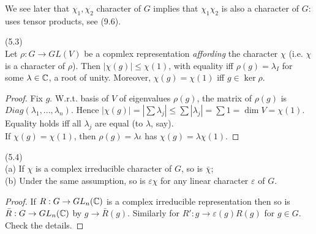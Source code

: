 \documentclass[a4paper]{article}
\begin{document}
\begin{rem}
We see later that $\chi_1,\chi_2$ character of $G$ implies that $\chi_1\chi_2$ is also a character of $G$: uses tensor products, see (9.6).
\end{rem}

\begin{lemma} (5.3)\\
Let $\rho:G \to GL(V)$ be a copmlex representation \emph{affording} the character $\chi$ (i.e. $\chi$ is a character of $\rho$). Then $|\chi(g)| \leq \chi(1)$, with equality iff $\rho(g) = \lambda_I$ for some $\lambda \in \mathbb{C}$, a root of unity. Moreover, $\chi(g) = \chi(1)$ iff $g \in \ker \rho$.
\begin{proof}
Fix $g$. W.r.t. basis of $V$ of eigenvalues $\rho(g)$, the matrix of $\rho(g)$ is $Diag(\lambda_1,...,\lambda_n)$. Hence $|\chi(g)| = |\sum \lambda_j| \leq \sum |\lambda_j|= \sum 1 = \dim V = \chi(1)$. Equality holds iff all $\lambda_j$ are equal (to $\lambda$, say).\\
If $\chi(g) = \chi(1)$, then $\rho(g) = \lambda \iota$ has $\chi(g) = \lambda \chi(1)$.
\end{proof}
\end{lemma}

\begin{lemma} (5.4)\\
(a) If $\chi$ is a complex irreducible character of $G$, so is $\bar{\chi}$;\\
(b) Under the same assumption, so is $\varepsilon\chi$ for any linear character $\varepsilon$ of $G$.\
\begin{proof}
If $R:G \to GL_n (\mathbb{C})$ is a complex irreducible representation then so is $\bar{R}: G \to GL_n (\mathbb{C})$ by $g \to \bar{R}(g)$. Similarly for $R': g \to \varepsilon(g) R(g)$ for $g \in G$. Check the details.
\end{proof}
\end{lemma}
\end{document}
